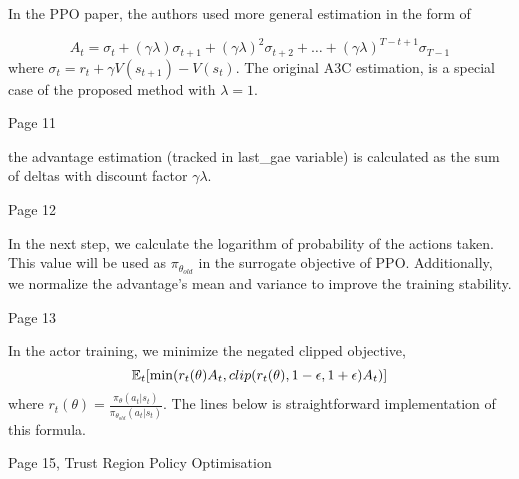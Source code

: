 In the PPO paper, the authors used more general estimation in the form of

\begin{equation*}
  A_t= \sigma_t+(\gamma\lambda)\sigma_{t+1}+(\gamma\lambda)^2\sigma_{t+2}+\ldots+(\gamma\lambda)^{T-t+1}\sigma_{T-1}
\end{equation*}
where \begin{math}\sigma_t=r_t+\gamma V(s_{t+1})-V(s_t)\end{math}. The original
A3C estimation, is a special case of the proposed method with \begin{math}\lambda=1\end{math}.

Page 11

the advantage estimation (tracked in last\_gae variable) is calculated as the sum of deltas with discount
factor \begin{math}\gamma\lambda\end{math}.

Page 12

In the next step, we calculate the logarithm of probability of the actions taken. This value will be used as
\begin{math}\pi_{\theta_{old}}\end{math} in the surrogate objective of PPO. Additionally, we normalize the advantage’s
mean and variance to improve the training stability.

Page 13

In the actor training, we minimize the negated clipped objective,
\begin{equation*}
\operatorname{\mathbb{E}}_t[\min(r_t(\theta)A_t,clip(r_t(\theta), 1-\epsilon, 1+\epsilon)A_t)]
\end{equation*}
where
\begin{math}r_t(\theta)=\frac{\pi_\theta(a_t|s_t)}{\pi_{\theta_{old}}(a_t|s_t)}\end{math}.
The lines below is straightforward implementation of this formula.

Page 15, Trust Region Policy Optimisation

